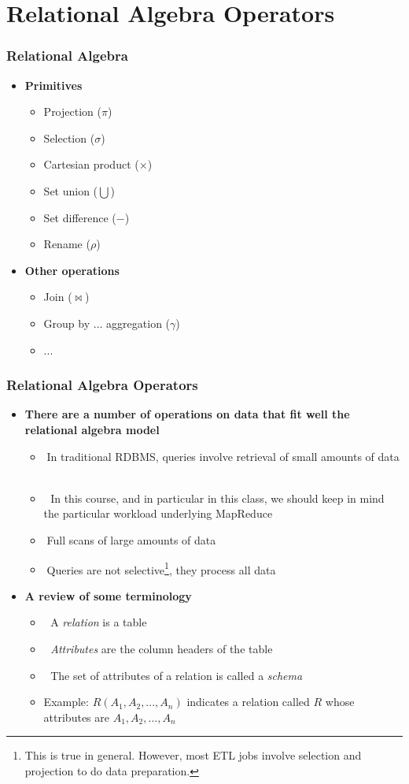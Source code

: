 \documentclass{beamer}
\newcommand{\bi}{\begin{itemize}}
\newcommand{\ei}{\end{itemize}}
\newcommand{\ii}{\item}
\newcommand*{\myblue}[1]{\textcolor{myblue}{#1}}
\newcommand*{\myred}[1]{\textcolor{myred}{#1}}
\newcommand{\select}{\sigma}
\newcommand{\project}{\pi}
\newcommand{\join}{\Join}
\begin{document}
\section{Relational Algebra Operators} 


\begin{frame}
\frametitle{Relational Algebra}

\bi
\ii \textbf{Primitives}
\bi
\ii Projection ($\project$)
\ii Selection ($\select$)
\ii Cartesian product ($\times$)
\ii Set union ($\bigcup$)
\ii Set difference ($-$)
\ii Rename ($\rho$)
\ei
\ei

\bi
\ii \textbf{Other operations}
\bi
\ii Join ($\join$)
\ii Group by ... aggregation ($\gamma$)
\ii ...
\ei
\ei

\end{frame}



\begin{frame}
\frametitle{Relational Algebra Operators}
\bi
\ii \textbf{There are a number of operations on data that fit well the relational algebra model}
\bi
\ii 􏰀In traditional RDBMS, queries involve retrieval of \myred{small amounts of data}
􏰀\ii 􏰀 In this course, and in particular in this class, we should keep in mind the particular workload underlying MapReduce
\ii 􏰀Full scans of large amounts of data
\ii 􏰀Queries are not selective\footnote{This is true in general. However, most ETL jobs involve selection and projection to do data preparation.}, they process all data
\ei
\ei

\bi
\ii \textbf{A review of some terminology}
\bi
\ii 􏰀 A \myred{\textit{relation}} is a table
\ii 􏰀 \myblue{\textit{Attributes}} are the column headers of the table
\ii 􏰀 The set of attributes of a relation is called a \myblue{\textit{schema}}
\ii Example: $R(A_1, A_2, ..., A_n)$ indicates a relation called $R$ whose attributes are $A_1, A_2, ..., A_n$
\ei
\ei
\end{frame}

\end{document}
